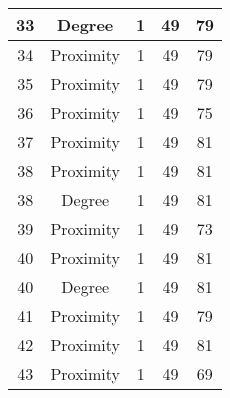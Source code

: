 \documentclass[results.tex]{subfiles}
\begin{document}
\begin{center}
\begin{tabular}{| c || c | c | c | c |}
            \hline
            33                      & Degree                       & 1                      & 49                      & 79                   \\
            \hline
            34                      & Proximity                    & 1                      & 49                      & 79                   \\
            \hline
            35                      & Proximity                    & 1                      & 49                      & 79                   \\
            \hline
            36                      & Proximity                    & 1                      & 49                      & 75                   \\
            \hline
            37                      & Proximity                    & 1                      & 49                      & 81                   \\
            \hline
            38                      & Proximity                    & 1                      & 49                      & 81                   \\
            \hline
            38                      & Degree                       & 1                      & 49                      & 81                   \\
            \hline
            39                      & Proximity                    & 1                      & 49                      & 73                   \\
            \hline
            40                      & Proximity                    & 1                      & 49                      & 81                   \\
            \hline
            40                      & Degree                       & 1                      & 49                      & 81                   \\
            \hline
            41                      & Proximity                    & 1                      & 49                      & 79                   \\
            \hline
            42                      & Proximity                    & 1                      & 49                      & 81                   \\
            \hline
            43                      & Proximity                    & 1                      & 49                      & 69                   \\

\end{tabular}
\end{center}
\end{document}
